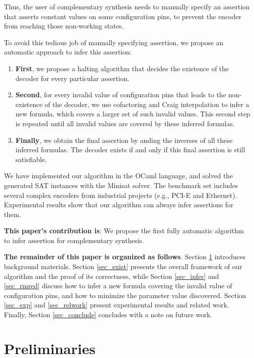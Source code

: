 \documentclass{sig-alternate}
\begin{document}
Thus,
the user of complementary synthesis needs to manually specify an assertion that asserts constant values on some configuration pins,
to prevent the encoder from reaching those non-working states.

To avoid this tedious job of manually specifying assertion,
we propose an automatic approach to infer this assertion:
\begin{enumerate}
 \item \textbf{First},
we propose a halting algorithm that decides the existence of the decoder for every particular assertion.
 \item \textbf{Second},
for every invalid value of configuration pins that leads to the non-existence of the decoder,
we use cofactoring\cite{Cofact} and Craig interpolation\cite{Craig} to infer a new formula,
which covers a larger set of such invalid values.
This second step is repeated until all invalid values are covered by these inferred formulas.
 \item \textbf{Finally},
we obtain the final assertion by anding the inverses of all these inferred formulas.
The decoder exists if and only if this final assertion is still satisfiable.
\end{enumerate}

We have implemented our algorithm in the OCaml language,
and solved the generated SAT instances with the Minisat solver\cite{EXTSAT}.
The benchmark set includes several complex encoders from industrial projects
(e.g.,
PCI-E\cite{PCIESPEC} and Ethernet\cite{IEEE80232002}).
Experimental results show that
our algorithm can always infer assertions for them.

\textbf{This paper's contribution is}:
We propose the first fully automatic algorithm to infer assertion for complementary synthesis.

\textbf{The remainder of this paper is organized as follows}.
Section \ref{sec_prem} introduces background materials.
Section \ref{sec_exist} presents the overall framework of our algorithm
and the proof of its correctness,
while Section \ref{sec_infer} and \ref{sec_rmred} discuss how to infer a new formula covering the invalid value of configuration pins,
and how to minimize the parameter value discovered.
Section \ref{sec_exp} and \ref{sec_relwork} present experimental results and related work.
Finally,
Section \ref{sec_conclude} concludes with a note on future work.

\section{Preliminaries}\label{sec_prem}
\end{document}
